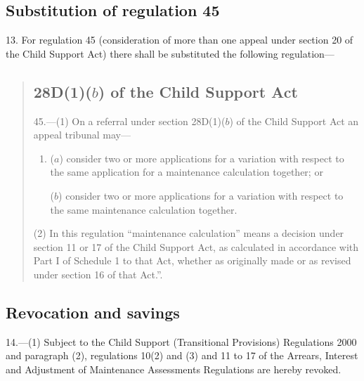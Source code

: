 \documentclass[12pt,a4paper]{article}
\begin{document}
\subsection[13. Substitution of regulation 45]{Substitution of regulation 45}

13.  For regulation 45 (consideration of more than one appeal under section 20 of the Child Support Act) there shall be substituted the following regulation—
\begin{quotation}
\subsection*{\sloppy {} 28D(1)($b$)  of the Child Support Act}

45.---(1)  On a referral under section 28D(1)($b$)  of the Child Support Act an appeal tribunal may—
\begin{enumerate}\item[]
($a$) consider two or more applications for a variation with respect to the same application for a maintenance calculation together; or

($b$) consider two or more applications for a variation with respect to the same maintenance calculation together.
\end{enumerate}

(2) In this regulation “maintenance calculation” means a decision under section 11 or 17 of the Child Support Act, as calculated in accordance with Part I of Schedule 1 to that Act, whether as originally made or as revised under section 16 of that Act.”.
\end{quotation}

\subsection[14, 15. Revocation and savings]{Revocation and savings}

14.---(1)  Subject to 
the Child Support (Transitional Provisions) Regulations 2000 and %
paragraph (2), regulations 10(2) and (3) and 11 to 17 of the Arrears, Interest and Adjustment of Maintenance Assessments Regulations are hereby revoked.
\end{document}
